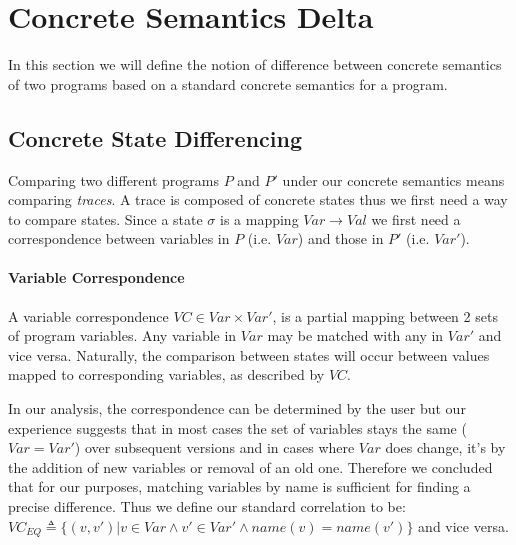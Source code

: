 \section{Concrete Semantics Delta}
In this section we will define the notion of difference between concrete semantics of two programs based on a standard concrete semantics for a program.

\subsection{Concrete State Differencing} 
Comparing two different programs $P$ and $P'$ under our concrete semantics means comparing \emph{traces}. A trace is composed of concrete states thus we first need a way to compare states. Since a state $\sigma$ is a mapping $Var \rightarrow Val$ we first need a correspondence between variables in $P$ (i.e. $Var$) and those in $P'$ (i.e. $Var'$).

\paragraph{Variable Correspondence} 
A variable correspondence $VC \in Var \times Var'$, is a partial mapping between 2 sets of program variables. Any variable in $Var$ may be matched with any in $Var'$ and vice versa. Naturally, the comparison between states will occur between values mapped to corresponding variables, as described by $VC$.

In our analysis, the correspondence can be determined by the user but our experience suggests that in most cases the set of variables stays the same ($Var = Var'$) over subsequent versions and in cases where $Var$ does change, it's by the addition of new variables or removal of an old one. Therefore we concluded that for our purposes, matching variables by name is sufficient for finding a precise difference. Thus we define our standard correlation to be: $VC_{EQ} \triangleq \{(v,v') | v \in Var \wedge v' \in Var' \wedge name(v) = name(v')\}$ and vice versa. %


